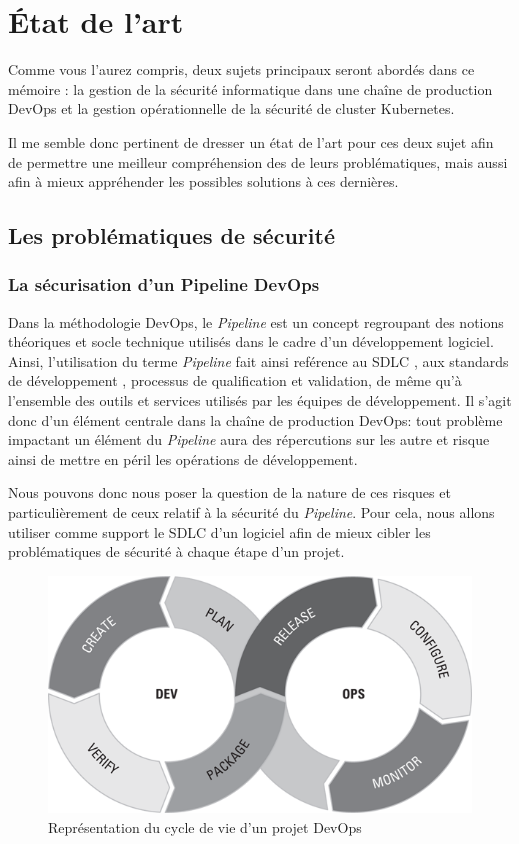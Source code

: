 \chapter{État de l'art}

Comme vous l'aurez compris, deux sujets principaux seront abordés dans ce mémoire : la gestion de la sécurité informatique
dans une chaîne de production DevOps et la gestion opérationnelle de la sécurité de 
cluster Kubernetes. 

Il me semble donc pertinent de dresser un état de l'art pour ces deux sujet afin de permettre une meilleur compréhension des
de leurs problématiques, mais aussi afin à mieux appréhender les possibles solutions à ces dernières.

\section{Les problématiques de sécurité}
\subsection{La sécurisation d'un Pipeline DevOps}

Dans la méthodologie DevOps, le \emph{Pipeline} est un concept regroupant des notions théoriques et socle technique utilisés dans 
le cadre d'un développement logiciel. Ainsi, l'utilisation du terme \emph{Pipeline} fait ainsi reférence au \ac{SDLC}
\autocite[Ch.\ 6]{devops_for_dummies_freeman_forsgren_2019}, aux standards de développement
\autocite[Ch.\ 9]{devops_for_dummies_freeman_forsgren_2019}, processus de qualification et 
validation, de même qu'à l'ensemble des outils et services utilisés par les équipes de développement. Il s'agit donc d'un élément
centrale dans la chaîne de production DevOps: tout problème impactant un élément du \emph{Pipeline} aura des répercutions sur les 
autre et risque ainsi de mettre en péril les opérations de développement.

Nous pouvons donc nous poser la question de la nature de ces risques et particulièrement de ceux relatif à la sécurité du 
\emph{Pipeline}. Pour cela, nous allons utiliser comme support le \ac{SDLC} d'un logiciel afin de mieux cibler les problématiques
de sécurité à chaque étape d'un projet.

\begin{figure}
    \centering
    \includegraphics[width=0.5\linewidth]{resources/img/devops_lifecycle.png}
    \caption{Représentation du cycle de vie d'un projet DevOps}
    \label{fig:devops-lifecycle}
  \end{figure}
\newpage

